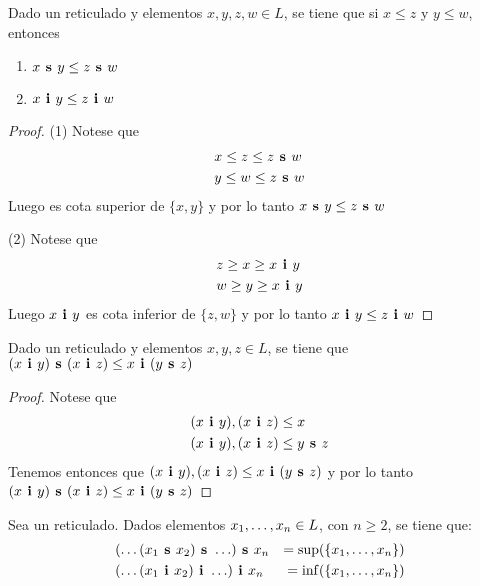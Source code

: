 \begin{lemma}
  Dado un reticulado \reticul y elementos $x, y, z, w \in L$, se tiene que
  si $x \leq z$ y $y \leq w$, entonces
  \begin{enumerate}
    \item $x\textbf{ s }y \leq z\textbf{ s }w$
    \item $x\textbf{ i }y \leq z\textbf{ i }w$
  \end{enumerate}
\end{lemma}
\begin{proof}
  (1) Notese que
  \begin{alignat*}{3}
    &x \leq z \leq z\textbf{ s }w\\
    &y \leq w \leq z\textbf{ s }w
  \end{alignat*}
  Luego  es cota superior de $\{x, y\}$ y por lo tanto $x\textbf{ s }y \leq z\textbf{ s }w$

  (2) Notese que
  \begin{alignat*}{3}
    &z \geq x \geq x\textbf{ i }y\\
    &w \geq y \geq x\textbf{ i }y
  \end{alignat*}
  Luego $x\textbf{ i }y$ es cota inferior de $\{z, w\}$ y por lo tanto $x\textbf{ i }y \leq z\textbf{ i }w$
\end{proof}
\begin{lemma}
  Dado un reticulado \reticul y elementos $x, y, z \in L$, se tiene que\\
  $(x\textbf{ i }y)\textbf{ s }(x\textbf{ i }z) \leq x\textbf{ i }(y\textbf{ s }z)$
\end{lemma}
\begin{proof}
  Notese que
  \begin{alignat*}{3}
    &(x\textbf{ i }y), (x\textbf{ i }z) \leq x\\
    &(x\textbf{ i }y), (x\textbf{ i }z) \leq y\textbf{ s }z
  \end{alignat*}
  Tenemos entonces que $(x\textbf{ i }y), (x\textbf{ i }z) \leq x\textbf{ i }(y\textbf{ s }z)$ y por lo tanto $(x\textbf{ i }y)\textbf{ s }(x\textbf{ i }z) \leq x\textbf{ i }(y\textbf{ s }z)$
\end{proof}
\begin{lemma}
  Sea \reticul un reticulado. Dados elementos $x_{1}, \dots, x_{n} \in L$, con $n \geq 2$,
  se tiene que:
  \begin{alignat*}{2}
    &\supbin{(\dots\supbin{(\supbin{x_1}{x_2})}{\dots})}{x_n} &= \sup({\{\succession{x}{1}{n}}\})\\
    &\infbin{(\dots\infbin{(\infbin{x_1}{x_2})}{\dots})}{x_n} &= \inf({\{\succession{x}{1}{n}}\})        
  \end{alignat*}
\end{lemma}

